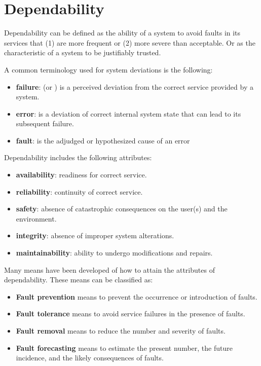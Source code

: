 \section{Dependability}
Dependability can be defined as the ability of a system to avoid faults in its services
that (1) are more frequent or (2) more severe than acceptable. Or as the characteristic of a system to be justifiably trusted.

A common terminology used for system deviations is the following: \cite{avizienis_basic_2004}

\begin{itemize}
  \item \textbf{failure}: (or ) is a perceived deviation from the correct service provided by a system.
  \item \textbf{error}: is a deviation of correct internal system state that can lead to its subsequent failure.
  \item \textbf{fault}: is the adjudged or
hypothesized cause of an error
\end{itemize}

Dependability includes the following attributes:\cite{avizienis_basic_2004}
\begin{itemize}
  \item \textbf{availability}: readiness for correct service.
  \item \textbf{reliability}: continuity of correct service.
  \item \textbf{safety}: absence of catastrophic consequences on the
user(s) and the environment.
  \item \textbf{integrity}: absence of improper system alterations.
  \item \textbf{maintainability}: ability to undergo modifications and repairs.
\end{itemize}

Many means have been developed of how to attain the attributes of dependability. These means can be classified as:

\begin{itemize}
  \item \textbf{Fault prevention} means to prevent the occurrence or introduction of faults.
  \item \textbf{Fault tolerance} means to avoid service failures in the presence of faults.
  \item \textbf{Fault removal} means to reduce the number and severity of faults.
  \item \textbf{Fault forecasting} means to estimate the present number, the future incidence, and the likely consequences of faults.
\end{itemize}


